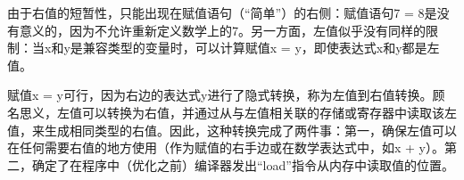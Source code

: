 由于右值的短暂性，只能出现在赋值语句（“简单”）的右侧：赋值语句7 = 8是没有意义的，因为不允许重新定义数学上的7。另一方面，左值似乎没有同样的限制：当x和y是兼容类型的变量时，可以计算赋值x = y，即使表达式x和y都是左值。

赋值x = y可行，因为右边的表达式y进行了隐式转换，称为左值到右值转换。顾名思义，左值可以转换为右值，并通过从与左值相关联的存储或寄存器中读取该左值，来生成相同类型的右值。因此，这种转换完成了两件事：第一，确保左值可以在任何需要右值的地方使用（作为赋值的右手边或在数学表达式中，如x + y）。第二，确定了在程序中（优化之前）编译器发出“load”指令从内存中读取值的位置。


















